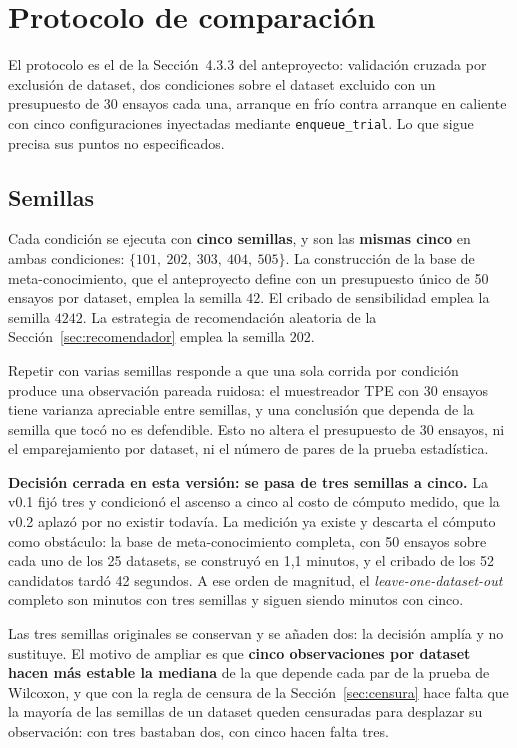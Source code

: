 \documentclass[11pt,letterpaper]{article}
\begin{document}
\section{Protocolo de comparación}
\label{sec:lodo}

El protocolo es el de la Sección~4.3.3 del anteproyecto: validación cruzada por
exclusión de dataset, dos condiciones sobre el dataset excluido con un
presupuesto de 30 ensayos cada una, arranque en frío contra arranque en caliente
con cinco configuraciones inyectadas mediante \texttt{enqueue\_trial}. Lo que
sigue precisa sus puntos no especificados.

\subsection{Semillas}

Cada condición se ejecuta con \textbf{cinco semillas}, y son las \textbf{mismas
cinco} en ambas condiciones: $\{101,\ 202,\ 303,\ 404,\ 505\}$. La construcción de
la base de meta-conocimiento, que el anteproyecto define con un presupuesto único
de 50 ensayos por dataset, emplea la semilla $42$. El cribado de sensibilidad
emplea la semilla $4242$. La estrategia de recomendación aleatoria de la
Sección~\ref{sec:recomendador} emplea la semilla $202$.

Repetir con varias semillas responde a que una sola corrida por condición produce
una observación pareada ruidosa: el muestreador TPE con 30 ensayos tiene varianza
apreciable entre semillas, y una conclusión que dependa de la semilla que tocó no
es defendible. Esto no altera el presupuesto de 30 ensayos, ni el emparejamiento
por dataset, ni el número de pares de la prueba estadística.

\textbf{Decisión cerrada en esta versión: se pasa de tres semillas a cinco.} La
v0.1 fijó tres y condicionó el ascenso a cinco al costo de cómputo medido, que la
v0.2 aplazó por no existir todavía. La medición ya existe y descarta el cómputo
como obstáculo: la base de meta-conocimiento completa, con 50 ensayos sobre cada
uno de los 25 datasets, se construyó en 1,1 minutos, y el cribado de los 52
candidatos tardó 42 segundos. A ese orden de magnitud, el
\textit{leave-one-dataset-out} completo son minutos con tres semillas y siguen
siendo minutos con cinco.

Las tres semillas originales se conservan y se añaden dos: la decisión amplía y
no sustituye. El motivo de ampliar es que \textbf{cinco observaciones por dataset hacen
más estable la mediana} de la que depende cada par de la prueba de Wilcoxon, y
que con la regla de censura de la Sección~\ref{sec:censura} hace falta que la
mayoría de las semillas de un dataset queden censuradas para desplazar su
observación: con tres bastaban dos, con cinco hacen falta tres.
\end{document}
